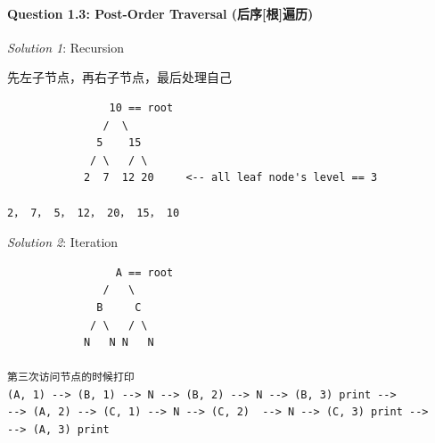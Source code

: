 \documentclass[11pt]{article}
\begin{document}
    \paragraph{Question 1.3: Post-Order Traversal
(后序{[}根{]}遍历)}\label{question-1.3-post-order-traversal-ux540eux5e8fux6839ux904dux5386}

\emph{Solution 1}: Recursion

先左子节点，再右子节点，最后处理自己

\begin{verbatim}
                10 == root
               /  \
              5    15
             / \   / \
            2  7  12 20     <-- all leaf node's level == 3

2， 7， 5， 12， 20， 15， 10
\end{verbatim}

\emph{Solution 2}: Iteration

\begin{verbatim}
                 A == root
               /   \
              B     C
             / \   / \ 
            N   N N   N     

第三次访问节点的时候打印
(A, 1) --> (B, 1) --> N --> (B, 2) --> N --> (B, 3) print -->
--> (A, 2) --> (C, 1) --> N --> (C, 2)  --> N --> (C, 3) print --> 
--> (A, 3) print
\end{verbatim}
\end{document}
